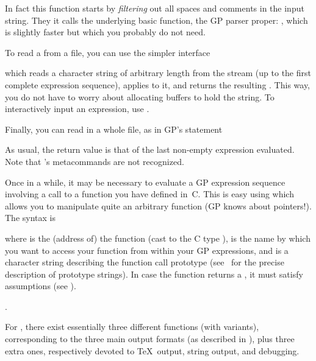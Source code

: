 
\noindent
In fact this function starts by \emph{filtering} out all spaces and comments
in the input string. They it calls the underlying basic function, the GP
parser proper: , which is slightly faster but
which you probably do not need.

To read a  from a file, you can use the simpler interface


\noindent which reads a character string of arbitrary length from the stream
 (up to the first complete expression sequence), applies
 to it, and returns the resulting . This way, you
do not have to worry about allocating buffers to hold the string. To
interactively input an expression, use .

Finally, you can read in a whole file, as in GP's  statement


\noindent As usual, the return value is that of the last non-empty expression
evaluated. Note that 's metacommands are not recognized.

Once in a while, it may be necessary to evaluate a GP expression sequence
involving a call to a function you have defined in~C. This is easy using
 which allows you to manipulate quite an arbitrary function (GP
knows about pointers!). The syntax is


\noindent where  is the (address of) the function (cast to the C type
),  is the name by which you want to access your
function from within your GP expressions, and  is a character
string describing the function call prototype (see~
for the precise description of prototype strings). In case the function
returns a , it must satisfy  assumptions (see
).

.

\noindent
For , there exist essentially three different functions (with
variants), corresponding to the three main  output formats (as described in
), plus three extra ones, respectively devoted to
\TeX\ output, string output, and debugging.

